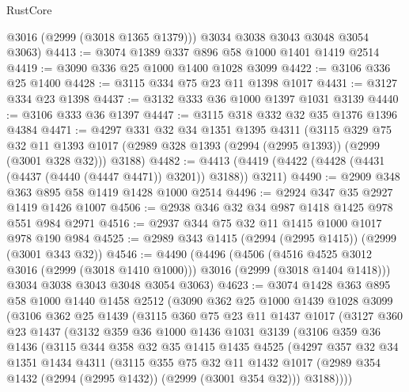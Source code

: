 \begin{lexlean}{RustCore}
\begin{coremodule}
        @3016
        (@2999 (@3018 @1365 @1379)))
      @3034
      @3038
      @3043
      @3048
      @3054
      @3063)
@4413 := @3074 @1389 @337 @896 @58 @1000 @1401 @1419 @2514
@4419 := @3090 @336 @25 @1000 @1400 @1028 @3099
@4422 := @3106 @336 @25 @1400
@4428 := @3115 @334 @75 @23 @11 @1398 @1017
@4431 := @3127 @334 @23 @1398
@4437 := @3132 @333 @36 @1000 @1397 @1031 @3139
@4440 := @3106 @333 @36 @1397
@4447 := @3115 @318 @332 @32 @35 @1376 @1396 @4384
@4471 := @4297
    @331
    @32
    @34
    @1351
    @1395
    @4311
    (@3115
      @329
      @75
      @32
      @11
      @1393
      @1017
      (@2989 @328 @1393 (@2994 (@2995 @1393)) (@2999 (@3001 @328 @32)))
      @3188)
@4482 := @4413 (@4419 (@4422 (@4428 (@4431 (@4437 (@4440 (@4447 @4471)) @3201)) @3188)) @3211)
@4490 := @2909 @348 @363 @895 @58 @1419 @1428 @1000 @2514
@4496 := @2924 @347 @35 @2927 @1419 @1426 @1007
@4506 := @2938 @346 @32 @34 @987 @1418 @1425 @978 @551 @984 @2971
@4516 := @2937 @344 @75 @32 @11 @1415 @1000 @1017 @978 @190 @984
@4525 := @2989 @343 @1415 (@2994 (@2995 @1415)) (@2999 (@3001 @343 @32))
@4546 := @4490
    (@4496
      (@4506
        (@4516 @4525 @3012 @3016 (@2999 (@3018 @1410 @1000)))
        @3016
        (@2999 (@3018 @1404 @1418)))
      @3034
      @3038
      @3043
      @3048
      @3054
      @3063)
@4623 := @3074
    @1428
    @363
    @895
    @58
    @1000
    @1440
    @1458
    @2512
    (@3090
      @362
      @25
      @1000
      @1439
      @1028
      @3099
      (@3106
        @362
        @25
        @1439
        (@3115
          @360
          @75
          @23
          @11
          @1437
          @1017
          (@3127
            @360
            @23
            @1437
            (@3132
              @359
              @36
              @1000
              @1436
              @1031
              @3139
              (@3106
                @359
                @36
                @1436
                (@3115
                  @344
                  @358
                  @32
                  @35
                  @1415
                  @1435
                  @4525
                  (@4297
                    @357
                    @32
                    @34
                    @1351
                    @1434
                    @4311
                    (@3115
                      @355
                      @75
                      @32
                      @11
                      @1432
                      @1017
                      (@2989 @354 @1432 (@2994 (@2995 @1432)) (@2999 (@3001 @354 @32)))
                      @3188))))

\end{coremodule}
\end{lexlean}
